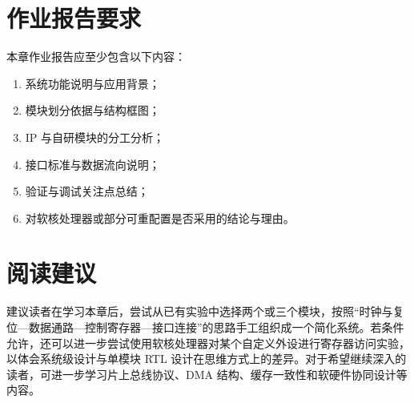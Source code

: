\section{作业报告要求}\label{ux4f5cux4e1aux62a5ux544aux8981ux6c42}

本章作业报告应至少包含以下内容：

\begin{enumerate}
\def\labelenumi{\arabic{enumi}.}
\tightlist
\item
  系统功能说明与应用背景；
\item
  模块划分依据与结构框图；
\item
  IP 与自研模块的分工分析；
\item
  接口标准与数据流向说明；
\item
  验证与调试关注点总结；
\item
  对软核处理器或部分可重配置是否采用的结论与理由。
\end{enumerate}

\section{阅读建议}\label{ux9605ux8bfbux5efaux8bae}

建议读者在学习本章后，尝试从已有实验中选择两个或三个模块，按照``时钟与复位---数据通路---控制寄存器---接口连接''的思路手工组织成一个简化系统。若条件允许，还可以进一步尝试使用软核处理器对某个自定义外设进行寄存器访问实验，以体会系统级设计与单模块
RTL
设计在思维方式上的差异。对于希望继续深入的读者，可进一步学习片上总线协议、DMA
结构、缓存一致性和软硬件协同设计等内容。
